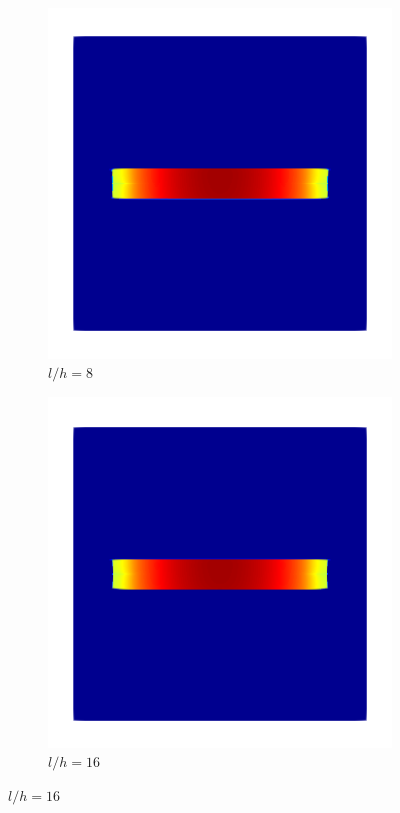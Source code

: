 \begin{frame}
\begin{columns}
\begin{column}{0.6\textwidth}
\begin{figure}
\begin{subfigure}{0.32\textwidth}
                    \includegraphics[width=\textwidth]{results/figures/structured_w_8.png}
                    \caption{$l/h = 8$}
                \end{subfigure}
                \begin{subfigure}{0.32\textwidth}
                    \centering
                    \includegraphics[width=\textwidth]{results/figures/structured_w_16.png}
                    \caption{$l/h = 16$}
                \end{subfigure}
            \end{figure}
        \end{column}
    \end{columns}
\end{frame}

